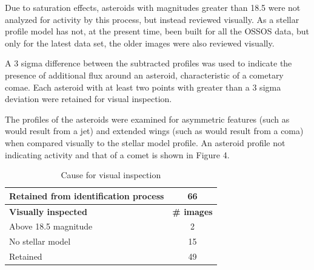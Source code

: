 \documentclass[iop,apj]{emulateapj}
\begin{document}
Due to saturation effects, asteroids with magnitudes greater than 18.5 were not analyzed for activity by this process, but instead reviewed visually. As a stellar profile model has not, at the present time, been built for all the OSSOS data, but only for the latest data set, the older images were also reviewed visually. 

A 3 sigma difference between the subtracted profiles was used to indicate the presence of additional flux around an asteroid, characteristic of a cometary comae. Each asteroid with at least two points with greater than a 3 sigma deviation were retained for visual inspection.

The profiles of the asteroids were examined for asymmetric features (such as would result from a jet) and extended wings (such as would result from a coma) when compared visually to the stellar model profile. An asteroid profile not indicating activity and that of a comet is shown in Figure 4. 

\begin{table}[htdp]
\caption{Cause for visual inspection}
\begin{center}
\begin{tabular}{lc}
	Retained from identification process			&	66 			\\
	\hline
	\textbf{Visually inspected}						& 	\textbf{\# images} \\
	\hline
	Above 18.5 magnitude			                          & 	2			\\
	No stellar model								&	15			\\
	\hline
	Retained										&	49
\end{tabular}
\end{center}
\label{default}
\end{table}
\end{document}
